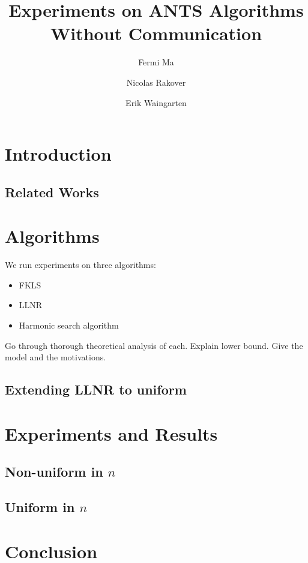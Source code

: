 \documentclass[runningheads,a4paper]{llncs}
\begin{document}
\mainmatter  

\title{Experiments on ANTS Algorithms Without Communication}
\author{Fermi Ma \and Nicolas Rakover \and Erik Waingarten}

\maketitle

\section{Introduction}

\subsection{Related Works}

\section{Algorithms}

We run experiments on three algorithms:
\begin{itemize}
\item FKLS
\item LLNR
\item Harmonic search algorithm
\end{itemize}

Go through thorough theoretical analysis of each. Explain lower bound. Give the model and the motivations.

\subsection{Extending LLNR to uniform}

\section{Experiments and Results}

\subsection{Non-uniform in $n$}

\subsection{Uniform in $n$}

\section{Conclusion}



\end{document}
